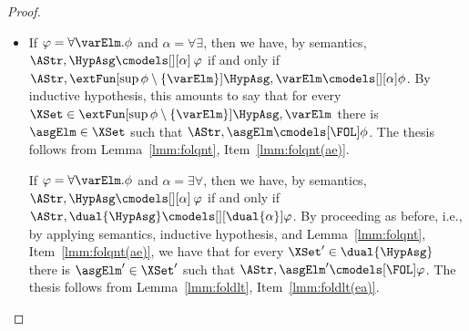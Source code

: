 \documentclass[authoryear]{elsarticle}
\begin{document}
\begin{proof}
\begin{itemize}
  \item If $\varphi = \forall \varElm . \phi$ and $\alpha = \forall\exists$,
    then we have, by semantics, $\AStr, \HypAsg \cmodels[][\alpha]\: \varphi$ if
    and only if $\AStr, \extFun[\sup{\phi} \setminus \{ \varElm \}]{\HypAsg,
      \varElm} \cmodels[][\alpha] \phi$.
    By inductive hypothesis, this amounts to say that for every $\XSet \in
    \extFun[\sup{\phi} \setminus \{ \varElm \}]{\HypAsg, \varElm}$ there is
    $\asgElm \in \XSet$ such that $\AStr, \asgElm \cmodels[\FOL]\phi$.
    The thesis follows from Lemma~\ref{lmm:folqnt}, Item~\ref{lmm:folqnt(ae)}.

    If $\varphi = \forall \varElm . \phi$ and $\alpha = \exists\forall$, then we
    have, by semantics, $\AStr, \HypAsg \cmodels[][\alpha]\: \varphi$ if and
    only if $\AStr, \dual{\HypAsg} \cmodels[][\dual{\alpha}] \varphi$.
    By proceeding as before, i.e., by applying semantics, inductive hypothesis,
    and Lemma~\ref{lmm:folqnt}, Item~\ref{lmm:folqnt(ae)}, we have that for
    every $\XSet' \in \dual{\HypAsg}$ there is $\asgElm' \in \XSet'$ such that
    $\AStr, \asgElm' \cmodels[\FOL]\varphi$.
    The thesis follows from Lemma~\ref{lmm:foldlt}, Item~\ref{lmm:foldlt(ea)}.
    \qedhere
%
  \end{itemize}
\end{proof}
\end{document}

